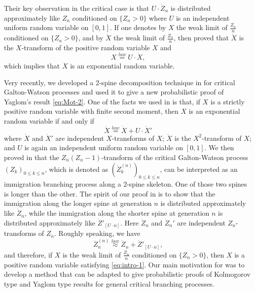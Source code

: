 	Their key observation in the critical case is that $U\cdot \dot Z_n$ is distributed approximately like $Z_n$ conditioned on $\{Z_n > 0\}$ where $U$ is an independent uniform random variable on $[0,1]$.
	If one denotes by $X$ the weak limit of $\frac{Z_n}{n}$ conditioned on $\{Z_n > 0\}$, and by $\dot X$  the weak limit of $\frac{\dot Z_n}{n}$, then \cite{LyonsPemantlePeres1995Conceptual} proved that $\dot X$ is the $X$-transform of the positive random variable $X$ and
\[
	X
	\overset{law}{=} U \cdot \dot X,
\]
	which implies that $X$ is an exponential random variable.
\par
	Very recently, we developed a 2-spine decomposition technique in \cite{RenSongSun2018A-2-spine} for critical Galton-Watson processes
	and used it to give a new probabilistic proof of Yaglom's result \eqref{eq:Mot-2}.
	One of the facts we used in \cite{RenSongSun2018A-2-spine} is that, if $X$ is a strictly positive random variable with finite second moment,
	then $X$ is an exponential random variable if and only if
\begin{equation}\label{eq:intro-1}
	\ddot X
	\overset{law}{=} \dot X + U \cdot \dot X'
\end{equation}
	where $\dot X$ and $\dot X'$ are independent $X$-transforms of $X$;
	$\ddot X$ is the $X^2$-transform of $X$;
	and $U$ is again an independent uniform random variable on $[0,1]$.
	We then proved in \cite{RenSongSun2018A-2-spine} that the $Z_n(Z_n-1)$-transform of the critical Galton-Watson process $(Z_k)_{0\leq k\leq n}$, which is denoted as $(\ddot Z_k^{(n)})_{0\leq k\leq n}$, can be interpreted as an immigration branching process along a 2-spine skeleton.
	One of those two spines is longer than the other.
	The spirit of our proof in \cite{RenSongSun2018A-2-spine} is to show that the immigration along the longer spine at generation $n$ is distributed approximately like $\dot Z_n$, while the immigration along the shorter spine at generation $n$ is distributed approximately like $\dot Z'_{[U\cdot n]}$.
	Here $\dot Z_n$ and $\dot Z_n'$ are independent $Z_n$-transforms of $Z_n$.
	Roughly speaking, we have
\[
	\ddot Z_n^{(n)}
	\overset{law}{\approx} \dot Z_n + \dot Z'_{[U\cdot n]},
\]
	and therefore, if $X$ is the weak limit of $\frac{Z_n}{n}$ conditioned on $\{Z_n>0\}$, then $X$ is a positive random variable satisfying \eqref{eq:intro-1}.
	Our main motivation for \cite{RenSongSun2018A-2-spine} was to develop a method that can be adapted to give probabilistic proofs of Kolmogorov type and Yaglom type results for general critical branching processes.
\par
